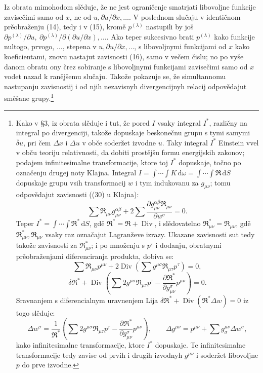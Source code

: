 \documentclass[11pt]{article}
\providecommand{\D}{\Delta}
\providecommand{\p}{\partial}
\providecommand{\dd}{\mathrm d}
\DeclareMathOperator{\Div}{Div}
\providecommand{\bd}{\bar{\delta}}
\begin{document}
Iz obrata mimohodom slěduje, že ne jest ograničenje smatrjati libovoljne funkcije zavisečimi samo od \(x\), ne od \(u,\p u/\p x,\ldots\). V poslednom slučaju v identičnom prěobraženju (14), tedy i v (15), kromě \(p^{(\lambda)}\) nastupili by još \(\p p^{(\lambda)}/\p u,\ \p p^{(\lambda)}/\p(\p u/\p x),\ldots\). Ako teper sukcesivno brati \(p^{(\lambda)}\) kako funkcije nultogo, prvogo, \(\ldots\), stepena v \(u,\p u/\p x,\ldots\), s libovoljnymi funkcijami od \(x\) kako koeficientami, znovu nastajut zavisnosti (16), samo v večem čislu; no po vyše danom obratu ony črez sobiranje s libovoljnymi funkcijami zavisečimi samo od \(x\) vodet nazad k ranějšemu slučaju. Takože pokazuje se, že simultannomu nastupanju zavisnostij i od njih nezavisnyh divergencijnyh relacij odpovědajut směšane grupy.\footnote{Kako v \S{}3, iz obrata slěduje i tut, že pored \(I\) vsaky integral \(I^*\), različny na integral po divergenciji, takože dopuskaje beskonečnu grupu s tymi samymi \(\bd u\), pri čem \(\D x\) i \(\D u\) v obče soderžet izvodne \(u\). Taky integral \(I^*\) Einstein vvel v obču teoriju relativnosti, da dobiti prostějšu formu energijskih zakonov; podajem infinitesimalne transformacije, ktore toj \(I^*\) dopuskaje, točno po označenju drugej noty Klajna. Integral \(I=\int\!\cdots\!\int K\,\dd\omega=\int\!\cdots\!\int \mathfrak{R}\,\dd S\) dopuskaje grupu vsih transformacij \(w\) i tym indukovanu za \(g_{\mu\nu}\); tomu odpovědajut zavisnosti ((30) u Klajna):
\[
\sum \mathfrak{R}_{\mu\nu}g_{\mu\nu}^{\alpha\beta}
+2\sum\frac{\p g_{\mu\nu}^{\alpha\beta}\mathfrak{R}_{\mu\nu}}{\p w^\sigma}=0.
\]
Teper \(I^*=\int\!\cdots\!\int \mathfrak{R}^*\,\dd S\), gdě \(\mathfrak{R}^*=\mathfrak{R}+\Div\), i slědovatelno \(\mathfrak{R}_{\mu\nu}^*=\mathfrak{R}_{\mu\nu}\), gdě \(\mathfrak{R}_{\mu\nu}^*,\mathfrak{R}_{\mu\nu}\) vsaky raz označajut Lagranževe izrazy. Ukazane zavisnosti sut tedy takože zavisnosti za \(\mathfrak{R}_{\mu\nu}^*\); i po množenju s \(p^\tau\) i dodanju, obratnymi prěobraženjami diferenciranja produkta, dobiva se:
\[
\sum \mathfrak{R}_{\mu\nu}p^{\mu\nu}
+2\Div\!\left(\sum g^{\mu\sigma}\mathfrak{R}_{\mu\tau}p^\tau\right)=0,
\]
\[
\delta\mathfrak{R}^*+\Div\!\left(\sum 2g^{\mu\sigma}\mathfrak{R}_{\mu\tau}p^\tau
-\frac{\p\mathfrak{R}^*}{\p g_{\mu\nu}^{\sigma}}p^{\mu\nu}\right)=0.
\]
Sravnanjem s diferencialnym uravnenjem Lija \(\delta\mathfrak{R}^*+\Div(\mathfrak{R}^*\D w)=0\) iz togo slěduje:
\[
\D w^\sigma=\frac1{\mathfrak{R}^*}\left(\sum 2g^{\mu\sigma}\mathfrak{R}_{\mu\tau}p^\tau
-\frac{\p\mathfrak{R}^*}{\p g_{\mu\nu}^{\sigma}}p^{\mu\nu}\right),
\qquad
\D g^{\mu\nu}=p^{\mu\nu}+\sum g^{\mu\nu}_{\sigma}\D w^\sigma,
\]
kako infinitesimalne transformacije, ktore \(I^*\) dopuskaje. Te infinitesimalne transformacije tedy zavise od prvih i drugih izvodnyh \(g^{\mu\nu}\) i soderžet libovoljne \(p\) do prve izvodne.}
\end{document}

